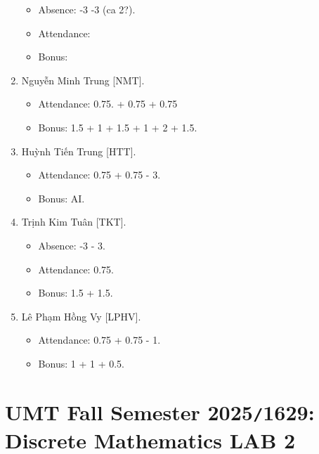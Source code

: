 \documentclass{article}
\begin{document}
\begin{enumerate}
\begin{itemize}
        \item Absence: -3 -3 (ca 2?).
        \item Attendance:
        \item Bonus:
    \end{itemize}
    \item {\sc Nguyễn Minh Trung [NMT].}
    \begin{itemize}
        \item Attendance: 0.75. + 0.75  + 0.75
        \item Bonus: 1.5 + 1 + 1.5 + 1 + 2 + 1.5.
    \end{itemize}
    \item {\sc Huỳnh Tiến Trung [HTT].}
    \begin{itemize}
        \item Attendance: 0.75 + 0.75 - 3.
        \item Bonus: AI.
    \end{itemize}
    \item {\sc Trịnh Kim Tuân [TKT].}
    \begin{itemize}
        \item Absence: -3 - 3.
        \item Attendance: 0.75.
        \item Bonus: 1.5 + 1.5.
    \end{itemize}
    \item {\sc Lê Phạm Hồng Vy [LPHV].}
    \begin{itemize}
        \item Attendance: 0.75 + 0.75 - 1.
        \item Bonus: 1 + 1 + 0.5.
    \end{itemize}
\end{enumerate}


\section{UMT Fall Semester 2025{\tt/}1629: Discrete Mathematics LAB 2}
\end{document}
